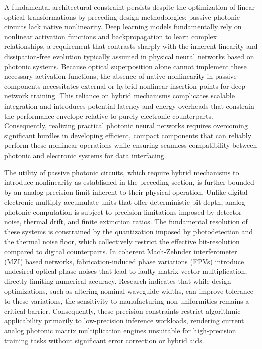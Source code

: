 \documentclass[11pt]{article}
\begin{document}
A fundamental architectural constraint persists despite the optimization of linear optical transformations by preceding design methodologies: passive photonic circuits lack native nonlinearity. Deep learning models fundamentally rely on nonlinear activation functions and backpropagation to learn complex relationships, a requirement that contrasts sharply with the inherent linearity and dissipation-free evolution typically assumed in physical neural networks based on photonic systems. \citep{doi_10_1002_adma_202522820_5596700a} Because optical superposition alone cannot implement these necessary activation functions, the absence of native nonlinearity in passive components necessitates external or hybrid nonlinear insertion points for deep network training. This reliance on hybrid mechanisms complicates scalable integration and introduces potential latency and energy overheads that constrain the performance envelope relative to purely electronic counterparts. Consequently, realizing practical photonic neural networks requires overcoming significant hurdles in developing efficient, compact components that can reliably perform these nonlinear operations while ensuring seamless compatibility between photonic and electronic systems for data interfacing. \citep{doi_10_1038_s41586_021_04223_6_6158a5ea} \citep{doi_10_1515_nanoph_2019_0474_d2187501} \citep{doi_10_3390_nano14080697_c372a140}

The utility of passive photonic circuits, which require hybrid mechanisms to introduce nonlinearity as established in the preceding section, is further bounded by an analog precision limit inherent to their physical operation. Unlike digital electronic multiply-accumulate units that offer deterministic bit-depth, analog photonic computation is subject to precision limitations imposed by detector noise, thermal drift, and finite extinction ratios. The fundamental resolution of these systems is constrained by the quantization imposed by photodetection and the thermal noise floor, which collectively restrict the effective bit-resolution compared to digital counterparts. In coherent Mach-Zehnder interferometer (MZI) based networks, fabrication-induced phase variations (FPVs) introduce undesired optical phase noises that lead to faulty matrix-vector multiplication, directly limiting numerical accuracy. Research indicates that while design optimizations, such as altering nominal waveguide widths, can improve tolerance to these variations, the sensitivity to manufacturing non-uniformities remains a critical barrier. Consequently, these precision constraints restrict algorithmic applicability primarily to low-precision inference workloads, rendering current analog photonic matrix multiplication engines unsuitable for high-precision training tasks without significant error correction or hybrid aids. \citep{doi_10_3390_nano14080697_c372a140} \citep{doi_10_3390_nano14080697_c372a140} \citep{doi_10_1109_tnano_2022_3223915_d4da3e6b} \citep{doi_10_1515_nanoph_2022_0423_38a2c3ec}
\end{document}
